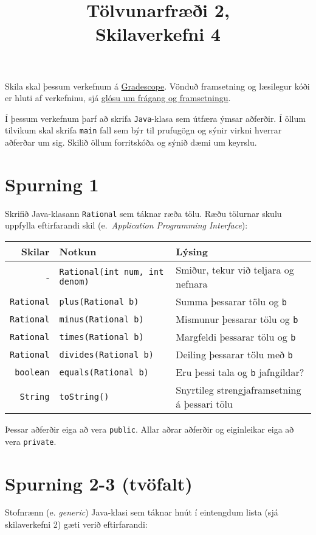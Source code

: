 \documentclass{article}
\title{Tölvunarfræði 2, \semester \\ Skilaverkefni 4}
\author{}
\begin{document}
\maketitle
{}

Skila skal þessum verkefnum á \href{https://gradescope.com/courses/5640}{Gradescope}. Vönduð framsetning og læsilegur kóði er hluti af verkefninu, sjá \href{https://piazza.com/class/ixkicfen49l111?cid=52}{glósu um frágang og framsetningu}.

Í þessum verkefnum þarf að skrifa \texttt{Java}-klasa sem útfæra ýmsar aðferðir. Í öllum tilvikum skal skrifa \texttt{main} fall sem býr til prufugögn og sýnir virkni hverrar aðferðar um sig. Skilið öllum forritskóða og sýnið dæmi um keyrslu.
\section{Spurning 1}

Skrifið Java-klasann \texttt{Rational} sem táknar ræða tölu. Ræðu tölurnar skulu uppfylla eftirfarandi skil (e.\ \emph{Application Programming Interface}):
\begin{center}
\begin{tabular}{rll}
\toprule
Skilar&Notkun&Lýsing\\
\midrule
-&\texttt{Rational(int num, int denom)}& Smiður, tekur við teljara og nefnara\\
\texttt{Rational}&\texttt{plus(Rational b)}&Summa þessarar tölu og \texttt{b}\\
\texttt{Rational}&\texttt{minus(Rational b)}&Mismunur þessarar tölu og \texttt{b}\\
\texttt{Rational}&\texttt{times(Rational b)}&Margfeldi þessarar tölu og \texttt{b}\\
\texttt{Rational}&\texttt{divides(Rational b)}&Deiling þessarar tölu með \texttt{b}\\
\texttt{boolean}&\texttt{equals(Rational b)}&Eru þessi tala og \texttt{b} jafngildar?\\
\texttt{String}&\texttt{toString()}&Snyrtileg strengjaframsetning á þessari tölu\\
\bottomrule
\end{tabular}
\end{center}
Þessar aðferðir eiga að vera \texttt{public}. Allar aðrar aðferðir og eiginleikar eiga að vera \texttt{private}.

\section{Spurning 2-3 (tvöfalt)}
Stofnrænn (e. \emph{generic}) Java-klasi sem táknar hnút í eintengdum lista (sjá skilaverkefni 2) gæti verið eftirfarandi:
\end{document}
